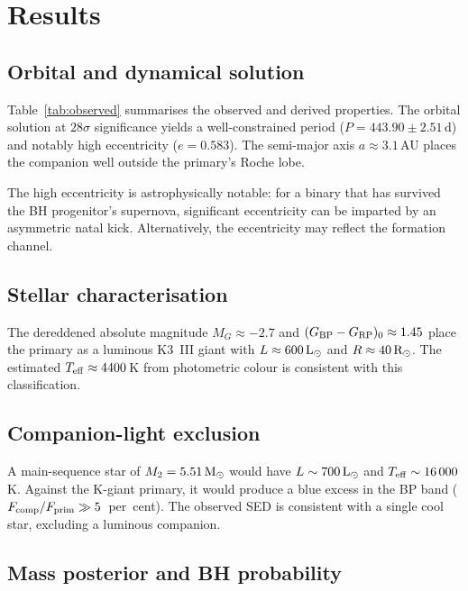 \documentclass[usenatbib,fleqn]{mnras}
\newcommand{\Msun}{{\rm M}_\odot}
\newcommand{\Lsun}{{\rm L}_\odot}
\newcommand{\Rsun}{{\rm R}_\odot}
\begin{document}
\section{Results}
\label{sec:results}

\subsection{Orbital and dynamical solution}
\label{sec:results:orbit}

Table~\ref{tab:observed} summarises the observed and derived
properties.  The orbital solution at $28\sigma$ significance yields
a well-constrained period ($P = 443.90 \pm 2.51$\,d) and notably
high eccentricity ($e = 0.583$).  The semi-major axis
$a \approx 3.1$\,AU places the companion well outside the
primary's Roche lobe.

The high eccentricity is astrophysically notable: for a binary
that has survived the BH progenitor's supernova, significant
eccentricity can be imparted by an asymmetric natal kick.
Alternatively, the eccentricity may reflect the formation channel.

\subsection{Stellar characterisation}
\label{sec:results:stellar}

The dereddened absolute magnitude $M_G \approx -2.7$ and
$(G_{\rm BP} - G_{\rm RP})_0 \approx 1.45$ place the primary as
a luminous K3~III giant with $L \approx 600\,\Lsun$ and
$R \approx 40\,\Rsun$.  The estimated $T_{\rm eff} \approx 4400$\,K
from photometric colour is consistent with this classification.

\subsection{Companion-light exclusion}
\label{sec:results:companion}

A main-sequence star of $M_2 = 5.51\,\Msun$ would have
$L \sim 700\,\Lsun$ and $T_{\rm eff} \sim 16\,000$\,K.  Against
the K-giant primary, it would produce a blue excess in the BP
band ($F_{\rm comp} / F_{\rm prim} \gg 5$~per~cent).  The observed
SED is consistent with a single cool star, excluding a luminous
companion.

\subsection{Mass posterior and BH probability}
\label{sec:results:posterior}
\end{document}
